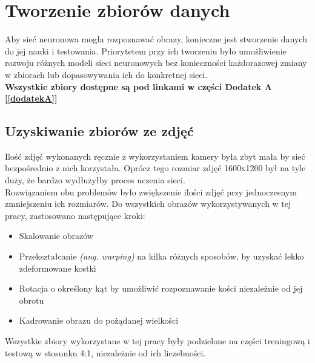 
\chapter{Tworzenie zbiorów danych}
Aby sieć neuronowa mogła rozpoznawać obrazy, konieczne jest stworzenie danych
do jej nauki i testowania. Priorytetem przy ich tworzeniu było
umożliwienie rozwoju różnych modeli sieci neuronowych bez konieczności każdorazowej
zmiany w zbiorach lub dopasowywania ich do konkretnej sieci.\\
\textbf{Wszystkie zbiory dostępne są pod linkami w części Dodatek A [\ref{dodatekA}] }

\section{Uzyskiwanie zbiorów ze zdjęć}
Ilość zdjęć wykonanych ręcznie z wykorzystaniem kamery była zbyt mała by sieć bezpośrednio
z nich korzystała. Oprócz tego rozmiar zdjęć 1600x1200 był na tyle duży, że bardzo wydłużyłby
proces uczenia sieci.\\
Rozwiązaniem obu problemów było zwiększenie ilości zdjęć przy jednoczesnym zmniejszeniu
ich rozmiarów. Do wszystkich obrazów wykorzystywanych w tej pracy, zastosowano następujące
kroki:
\begin{itemize}
\item Skalowanie obrazów
\item Przekształcanie \textit{(ang. warping)} na kilka różnych sposobów, by uzyskać lekko zdeformowane kostki
\item Rotacja o określony kąt by umożliwić rozpoznawanie kości niezależnie od jej obrotu
\item Kadrowanie obrazu do pożądanej wielkości
\end{itemize}
Wszystkie zbiory wykorzystane w tej pracy były podzielone na części treningową i testową
w stosunku 4:1, niezależnie od ich liczebności.

